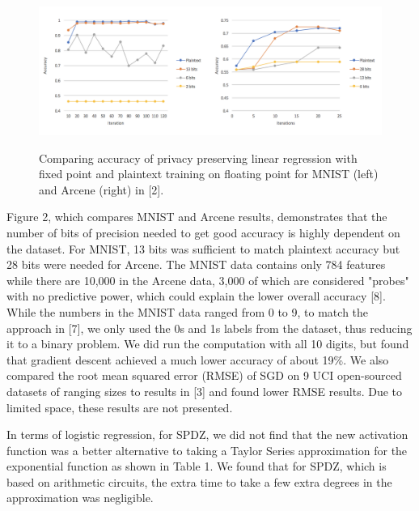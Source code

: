 \documentclass{article}
\begin{document}
\begin{figure}[h!]
\vspace{-4mm}
\centering
  \includegraphics[scale=0.6]{mnistarcene.png}
  \label{fig:result4}
  \vspace{-4mm}
   \caption{Comparing accuracy of privacy preserving linear regression with fixed point and plaintext training on floating point for MNIST (left) and Arcene (right) in [2].}
   \vspace{-4mm}
\end{figure}

Figure 2, which compares MNIST and Arcene results, demonstrates that the number of bits of precision needed to get good accuracy is highly dependent on the dataset. For MNIST, 13 bits was sufficient to match plaintext accuracy but 28 bits were needed for Arcene. The MNIST data contains only 784 features while there are 10,000 in the Arcene data, 3,000 of which are considered "probes" with no predictive power, which could explain the lower overall accuracy [8]. While the numbers in the MNIST data ranged from 0 to 9, to match the approach in [7], we only used the 0s and 1s labels from the dataset, thus reducing it to a binary problem. We did run the computation with all 10 digits, but found that gradient descent achieved a much lower accuracy of about 19\%. We also compared the root mean squared error (RMSE) of SGD on 9 UCI open-sourced datasets of ranging sizes to results in [3] and found lower RMSE results. Due to limited space, these results are not presented.

In terms of logistic regression, for SPDZ, we did not find that the new activation function was a better alternative to taking a Taylor Series approximation for the exponential function as shown in Table 1. We found that for SPDZ, which is based on arithmetic circuits, the extra time to take a few extra degrees in the approximation was negligible.  
\end{document}
